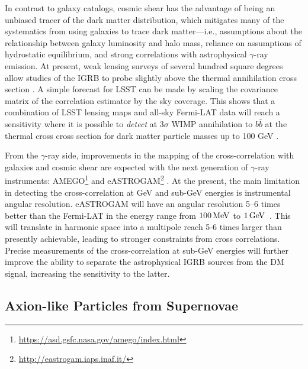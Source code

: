 In contrast to galaxy catalogs, cosmic shear has the advantage of being an unbiased tracer of the dark matter distribution, which mitigates many of the systematics from using galaxies to trace dark matter---i.e., assumptions about the relationship between galaxy luminosity and halo mass, reliance on assumptions of hydrostatic equilibrium, and strong correlations with astrophysical $\gamma$-ray emission. At present, weak lensing surveys of several hundred square degrees allow studies of the IGRB to probe slightly above the thermal annihilation cross section \citep{1404.5503,1607.02187,1611.03554}. A simple forecast for LSST can be made by scaling the covariance matrix of the correlation estimator by the sky coverage. This shows that a combination of LSST lensing maps and all-sky Fermi-LAT data will reach a sensitivity where it is possible to \textit{detect} at $3\sigma$ WIMP annihilation to $b\bar{b}$ at the thermal cross cross section for dark matter particle masses up to 100 GeV \citep{1404.5503}.   


From the $\gamma$-ray side, improvements in the mapping of the cross-correlation with galaxies and cosmic shear are expected with the next generation of $\gamma$-ray instruments: AMEGO\footnote{\url{https://asd.gsfc.nasa.gov/amego/index.html}} and eASTROGAM\footnote{\url{http://eastrogam.iaps.inaf.it/}} \citep{1711.01265}.
At the present, the main limitation in detecting the cross-correlation at GeV and sub-GeV energies is instrumental angular resolution.  
eASTROGAM will have an angular resolution 5--6 times better than the Fermi-LAT in the energy range from $100 \mathrm{\,MeV}$ to $1 \mathrm{\,GeV}$~\citep{1711.01265}. This will translate in harmonic space into a multipole reach 5-6 times larger than presently achievable, leading to stronger constraints from cross correlations.
Precise measurements of the cross-correlation at sub-GeV energies will further improve the ability to separate the astrophysical IGRB sources from the DM signal, increasing the sensitivity to the latter. 

\subsection{Axion-like Particles from Supernovae }
\label{sec:alp_id}

